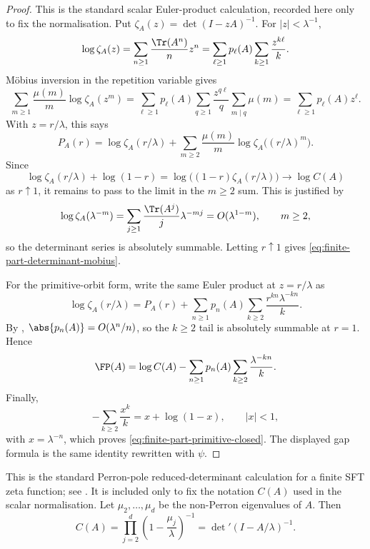 \begin{proof}
  This is the standard scalar Euler-product calculation, recorded here
  only to fix the normalisation. Put
  \(\zeta_A(z)=\det(I-zA)^{-1}\). For \(|z|<\lambda^{-1}\),
  \[
    \log\zeta_A(z)
    =
    \sum_{n\ge 1}\frac{\Tr(A^n)}{n}z^n
    =
    \sum_{\ell\ge 1}p_\ell(A)\sum_{k\ge 1}\frac{z^{k\ell}}{k}.
  \]
  M\"obius inversion in the repetition variable gives
  \[
    \sum_{m\ge 1}\frac{\mu(m)}{m}\log\zeta_A(z^m)
    =
    \sum_{\ell\ge 1}p_\ell(A)
      \sum_{q\ge 1}
        \frac{z^{q\ell}}{q}\sum_{m\mid q}\mu(m)
    =
    \sum_{\ell\ge 1}p_\ell(A)z^\ell.
  \]
  With \(z=r/\lambda\), this says
  \[
    P_A(r)
    =
    \log\zeta_A(r/\lambda)
    +\sum_{m\ge 2}\frac{\mu(m)}{m}
      \log\zeta_A\bigl((r/\lambda)^m\bigr).
  \]
  Since
  \[
    \log\zeta_A(r/\lambda)+\log(1-r)
    =
    \log\bigl((1-r)\zeta_A(r/\lambda)\bigr)
    \longrightarrow \log C(A)
  \]
  as \(r\uparrow 1\), it remains to pass to the limit in the \(m\ge2\)
  sum. This is justified by
  \[
    \log\zeta_A(\lambda^{-m})
    =
    \sum_{j\ge 1}\frac{\Tr(A^j)}{j}\lambda^{-mj}
    =
    O(\lambda^{1-m}),
    \qquad m\ge 2,
  \]
  so the determinant series is absolutely summable. Letting
  \(r\uparrow1\) gives \eqref{eq:finite-part-determinant-mobius}.

  For the primitive-orbit form, write the same Euler product at
  \(z=r/\lambda\) as
  \[
    \log\zeta_A(r/\lambda)
    =
    P_A(r)
    +\sum_{n\ge 1}p_n(A)\sum_{k\ge 2}
      \frac{r^{kn}\lambda^{-kn}}{k}.
  \]
  By ,
  \(\abs{p_n(A)}=O(\lambda^n/n)\), so the \(k\ge2\) tail is absolutely
  summable at \(r=1\). Hence
  \[
    \FP(A)
    =
    \log C(A)
    -\sum_{n\ge 1}p_n(A)\sum_{k\ge 2}\frac{\lambda^{-kn}}{k}.
  \]
  Finally,
  \[
    -\sum_{k\ge 2}\frac{x^k}{k}=x+\log(1-x),
    \qquad |x|<1,
  \]
  with \(x=\lambda^{-n}\), which proves
  \eqref{eq:finite-part-primitive-closed}. The displayed gap formula is
  the same identity rewritten with \(\psi\).
\end{proof}

\begin{proposition}
  \label{prop:finite-part-residue-reduced-determinant}
  This is the standard Perron-pole reduced-determinant calculation for a
  finite SFT zeta function; see
  \cite{BowenLanford1970Zeta,LindMarcus1995,ParryPollicott1990Zeta}.  It
  is included only to fix the notation \(C(A)\) used in the scalar
  normalisation.
  Let \(\mu_2,\dots,\mu_d\) be the non-Perron eigenvalues of \(A\). Then
  \[
    C(A)
    =\prod_{j=2}^d\left(1-\frac{\mu_j}{\lambda}\right)^{-1}
    =\det\nolimits'(I-A/\lambda)^{-1}.
  \]
\end{proposition}

